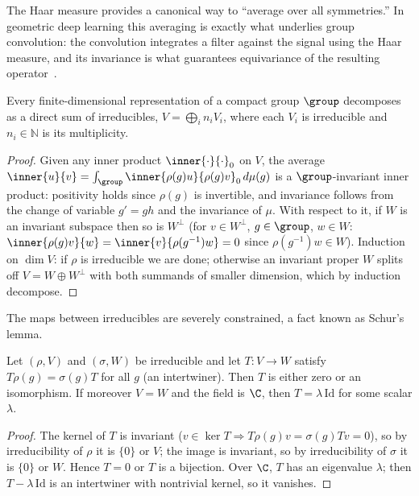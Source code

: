 The Haar measure provides a canonical way to ``average over all symmetries.'' In
geometric deep learning this averaging is exactly what underlies group
convolution: the convolution integrates a filter against the signal using the
Haar measure, and its invariance is what guarantees equivariance of the resulting
operator~\citep{cohen2016group}.

\begin{theorem}
\label{thm:found:decomposition}
Every finite-dimensional representation of a compact group $\group$ decomposes
as a direct sum of irreducibles, $V = \bigoplus_i n_i V_i$, where each $V_i$ is
irreducible and $n_i \in \mathbb{N}$ is its multiplicity.
\end{theorem}

\begin{proof}
Given any inner product $\inner{\cdot}{\cdot}_0$ on $V$, the average
$\inner{u}{v} = \int_\group \inner{\rho(g)u}{\rho(g)v}_0\, d\mu(g)$ is a
$\group$-invariant inner product: positivity holds since $\rho(g)$ is invertible,
and invariance follows from the change of variable $g' = gh$ and the invariance
of $\mu$. With respect to it, if $W$ is an invariant subspace then so is $W^\perp$
(for $v \in W^\perp$, $g \in \group$, $w \in W$: $\inner{\rho(g)v}{w} =
\inner{v}{\rho(g^{-1})w} = 0$ since $\rho(g^{-1})w \in W$). Induction on
$\dim V$: if $\rho$ is irreducible we are done; otherwise an invariant proper
$W$ splits off $V = W \oplus W^\perp$ with both summands of smaller dimension,
which by induction decompose.
\end{proof}

The maps between irreducibles are severely constrained, a fact known as Schur's
lemma.

\begin{lemma}[Schur]
\label{lem:found:schur}
Let $(\rho, V)$ and $(\sigma, W)$ be irreducible and let $T : V \to W$ satisfy
$T\rho(g) = \sigma(g)T$ for all $g$ (an intertwiner). Then $T$ is either zero or
an isomorphism. If moreover $V = W$ and the field is $\C$, then $T =
\lambda\,\mathrm{Id}$ for some scalar $\lambda$.
\end{lemma}

\begin{proof}
The kernel of $T$ is invariant ($v \in \ker T \Rightarrow T\rho(g)v =
\sigma(g)Tv = 0$), so by irreducibility of $\rho$ it is $\{0\}$ or $V$; the image
is invariant, so by irreducibility of $\sigma$ it is $\{0\}$ or $W$. Hence
$T = 0$ or $T$ is a bijection. Over $\C$, $T$ has an eigenvalue $\lambda$; then
$T - \lambda\,\mathrm{Id}$ is an intertwiner with nontrivial kernel, so it
vanishes.
\end{proof}

